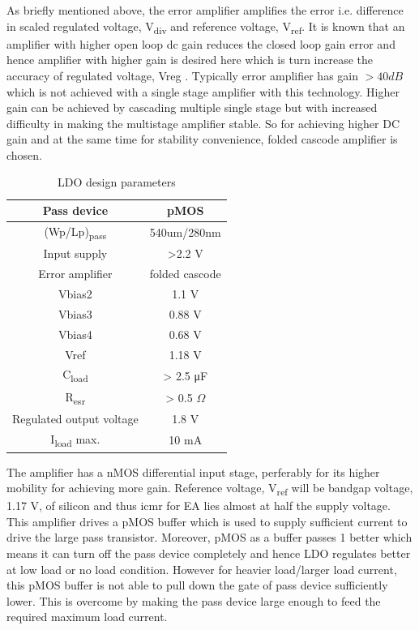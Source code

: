 \documentclass[UKenglish]{ifimaster}  %
\begin{document}
As briefly mentioned above, the error amplifier amplifies the error i.e. difference in scaled regulated voltage, 
V\textsubscript{div} and reference voltage, V\textsubscript{ref}. It is known that an amplifier with higher 
open loop \acrshort{dc} gain reduces the closed loop gain error and hence amplifier with higher gain is desired 
here which is turn increase the accuracy of regulated voltage, Vreg \cite{ldo_bulkmod}. Typically error amplifier 
has gain $> 40 dB$ which is not achieved with a single stage amplifier with this technology. Higher gain can be 
achieved by cascading multiple single stage but with increased difficulty in making the multistage
amplifier stable. So for achieving higher DC gain and at the same time for stability convenience, folded cascode 
amplifier \cite[pp. xx]{razavi_2001} is chosen. \\

\begin{table}[H]
\caption{LDO design parameters}
\begin{center}
\begin{tabular}{c|c}
\hline \hline
Pass device				& pMOS \\ \hline
(Wp/Lp)\textsubscript{pass} 	& 540um/280nm \\ \hline
Input supply 				& >2.2 V \\ \hline
Error amplifier				& folded cascode \\ \hline
Vbias2 					& 1.1 V \\ \hline
Vbias3					& 0.88 V \\ \hline
Vbias4					& 0.68 V \\ \hline
Vref						& 1.18 V \\ \hline
C\textsubscript{load} 		& > 2.5 \si{\micro\farad}  \\ \hline
R\textsubscript{esr} 	 		& > 0.5 $\Omega$ \\ \hline
Regulated output voltage 		& 1.8 V \\ \hline
I\textsubscript{load} max. 		& 10 mA \\
\hline \hline
\end{tabular}
\end{center}
\label{tab:ldo_parameter}
\end{table}

The amplifier has a nMOS differential input stage, perferably for its higher mobility for achieving more gain.
Reference voltage, V\textsubscript{ref} will be bandgap voltage, 1.17 V, of silicon and  thus \acrshort{icmr} 
for EA lies almost at half the supply voltage. This amplifier drives a pMOS buffer which is used to supply 
sufficient current to drive the large pass transistor. Moreover, pMOS as a buffer passes 1 better which means 
it can turn off the pass device completely and hence LDO regulates better at low load or no load condition. 
However for heavier load/larger load current, this pMOS buffer is not able to pull down the gate of pass device 
sufficiently lower. This is overcome by making the pass device large enough to feed the required  maximum 
load current.\\
\end{document}
